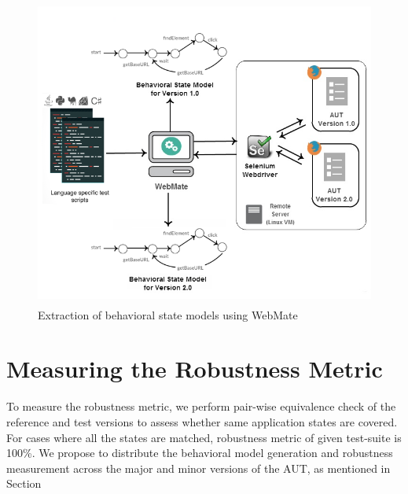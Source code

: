 \begin{figure}[h!]
\makeatletter 
\renewcommand{\thefigure}{\@arabic\c@figure}
\makeatother
    \centering
  \includegraphics[width=5in,height=4in]{./Figures/WebMate_state_extraction}
  \caption{Extraction of behavioral state models using WebMate \cite{webmate}}
  \label{fig:stateModelExtraction} 
\end{figure}

\section{Measuring the Robustness Metric}
\label{sec:MeasureRobMetric}
\vspace{-2mm} To measure the robustness metric, we perform pair-wise equivalence check of the reference and test versions to assess whether same application states are covered. For cases where all the states are matched, robustness metric of given test-suite is 100\%. We propose to distribute the behavioral model generation and robustness measurement across the major and minor versions of the AUT, as mentioned in Section
